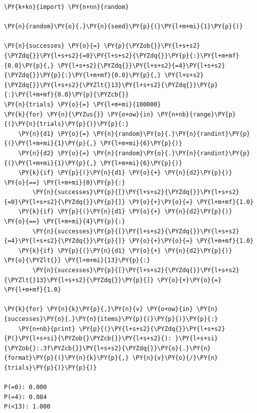 \begin{Answer}
\begin{tcolorbox}[breakable, size=fbox, boxrule=1pt, pad at break*=1mm,colback=cellbackground, colframe=cellborder]
\begin{Verbatim}[commandchars=\\\{\}]
\PY{k+kn}{import} \PY{n+nn}{random}
	
\PY{n}{random}\PY{o}{.}\PY{n}{seed}\PY{p}{(}\PY{l+m+mi}{1}\PY{p}{)}
	
\PY{n}{successes} \PY{o}{=} \PY{p}{\PYZob{}}\PY{l+s+s2}{\PYZdq{}}\PY{l+s+s2}{=0}\PY{l+s+s2}{\PYZdq{}}\PY{p}{:}\PY{l+m+mf}{0.0}\PY{p}{,} \PY{l+s+s2}{\PYZdq{}}\PY{l+s+s2}{=4}\PY{l+s+s2}{\PYZdq{}}\PY{p}{:}\PY{l+m+mf}{0.0}\PY{p}{,} \PY{l+s+s2}{\PYZdq{}}\PY{l+s+s2}{\PYZlt{}13}\PY{l+s+s2}{\PYZdq{}}\PY{p}{:}\PY{l+m+mf}{0.0}\PY{p}{\PYZcb{}}
\PY{n}{trials} \PY{o}{=} \PY{l+m+mi}{100000}
\PY{k}{for} \PY{n}{\PYZus{}} \PY{o+ow}{in} \PY{n+nb}{range}\PY{p}{(}\PY{n}{trials}\PY{p}{)}\PY{p}{:}
    \PY{n}{d1} \PY{o}{=} \PY{n}{random}\PY{o}{.}\PY{n}{randint}\PY{p}{(}\PY{l+m+mi}{1}\PY{p}{,} \PY{l+m+mi}{6}\PY{p}{)}
    \PY{n}{d2} \PY{o}{=} \PY{n}{random}\PY{o}{.}\PY{n}{randint}\PY{p}{(}\PY{l+m+mi}{1}\PY{p}{,} \PY{l+m+mi}{6}\PY{p}{)}
    \PY{k}{if} \PY{p}{(}\PY{n}{d1} \PY{o}{+} \PY{n}{d2}\PY{p}{)} \PY{o}{==} \PY{l+m+mi}{0}\PY{p}{:}
        \PY{n}{successes}\PY{p}{[}\PY{l+s+s2}{\PYZdq{}}\PY{l+s+s2}{=0}\PY{l+s+s2}{\PYZdq{}}\PY{p}{]} \PY{o}{+}\PY{o}{=} \PY{l+m+mf}{1.0}
    \PY{k}{if} \PY{p}{(}\PY{n}{d1} \PY{o}{+} \PY{n}{d2}\PY{p}{)} \PY{o}{==} \PY{l+m+mi}{4}\PY{p}{:}
        \PY{n}{successes}\PY{p}{[}\PY{l+s+s2}{\PYZdq{}}\PY{l+s+s2}{=4}\PY{l+s+s2}{\PYZdq{}}\PY{p}{]} \PY{o}{+}\PY{o}{=} \PY{l+m+mf}{1.0}
    \PY{k}{if} \PY{p}{(}\PY{n}{d1} \PY{o}{+} \PY{n}{d2}\PY{p}{)} \PY{o}{\PYZlt{}} \PY{l+m+mi}{13}\PY{p}{:}
        \PY{n}{successes}\PY{p}{[}\PY{l+s+s2}{\PYZdq{}}\PY{l+s+s2}{\PYZlt{}13}\PY{l+s+s2}{\PYZdq{}}\PY{p}{]} \PY{o}{+}\PY{o}{=} \PY{l+m+mf}{1.0}
	
\PY{k}{for} \PY{n}{k}\PY{p}{,}\PY{n}{v} \PY{o+ow}{in} \PY{n}{successes}\PY{o}{.}\PY{n}{items}\PY{p}{(}\PY{p}{)}\PY{p}{:}
    \PY{n+nb}{print} \PY{p}{(}\PY{l+s+s2}{\PYZdq{}}\PY{l+s+s2}{P(}\PY{l+s+si}{\PYZob{}\PYZcb{}}\PY{l+s+s2}{): }\PY{l+s+si}{\PYZob{}:.3f\PYZcb{}}\PY{l+s+s2}{\PYZdq{}}\PY{o}{.}\PY{n}{format}\PY{p}{(}\PY{n}{k}\PY{p}{,} \PY{n}{v}\PY{o}{/}\PY{n}{trials}\PY{p}{)}\PY{p}{)}
	
P(=0): 0.000
P(=4): 0.084
P(<13): 1.000
\end{Verbatim}
\end{tcolorbox}
\end{Answer}



